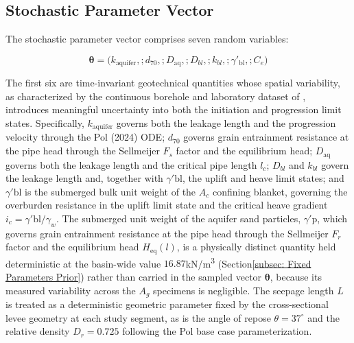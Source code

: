 \subsection{Stochastic Parameter Vector}
\label{subsec: Stochastic Parameter Vector}

The stochastic parameter vector comprises seven random variables:

$$\boldsymbol{\theta} = \bigl(k_\mathrm{aquifer},; d_{70},; D_\mathrm{aq},; D_{bl},; k_{bl},; \gamma'_\mathrm{bl},; C_e\bigr)$$

The first six are time-invariant geotechnical quantities whose spatial variability, as characterized by the continuous borehole and laboratory dataset of \textcite{oyo_1999}, introduces meaningful uncertainty into both the initiation and progression limit states. Specifically, $k_\mathrm{aquifer}$ governs both the leakage length and the progression velocity through the Pol (2024) ODE; $d_{70}$ governs grain entrainment resistance at the pipe head through the Sellmeijer $F_s$ factor and the equilibrium head; $D_\mathrm{aq}$ governs both the leakage length and the critical pipe length $l_c$; $D_{bl}$ and $k_{bl}$ govern the leakage length and, together with $\gamma'\mathrm{bl}$, the uplift and heave limit states; and $\gamma'\mathrm{bl}$ is the submerged bulk unit weight of the $A_c$ confining blanket, governing the overburden resistance in the uplift limit state and the critical heave gradient $i_c = \gamma'\mathrm{bl}/\gamma_w$. The submerged unit weight of the aquifer sand particles, $\gamma'\mathrm{p}$, which governs grain entrainment resistance at the pipe head through the Sellmeijer $F_r$ factor and the equilibrium head $H_\mathrm{eq}(l)$, is a physically distinct quantity held deterministic at the basin-wide value $16.87$kN/m\textsuperscript{3} (Section\ref{subsec: Fixed Parameters Prior}) rather than carried in the sampled vector $\boldsymbol{\theta}$, because its measured variability across the $A_g$ specimens is negligible. The seepage length $L$ is treated as a deterministic geometric parameter fixed by the cross-sectional levee geometry at each study segment, as is the angle of repose $\theta = 37^\circ$ and the relative density $D_r = 0.725$ following the Pol base case parameterization.

